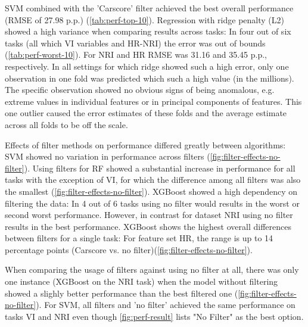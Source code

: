 \documentclass[letterpaper, peerreview, draftcls]{IEEEtran}
\begin{document}
SVM combined with the 'Carscore' filter achieved the best overall performance (RMSE of 27.98 p.p.) (\autoref{tab:perf-top-10}).
Regression with ridge penalty (L2) showed a high variance when comparing results across tasks: In four out of six tasks (all which VI variables and HR-NRI) the error was out of bounds (\autoref{tab:perf-worst-10}).
For NRI and HR RMSE was 31.16 and 35.45 p.p., respectively.
In all settings for which ridge showed such a high error, only one observation in one fold was predicted which such a high value (in the millions).
The specific observation showed no obvious signs of being anomalous, e.g. extreme values in individual features or in principal components of features.
This one outlier caused the error estimates of these folds and the average estimate across all folds to be off the scale.

Effects of filter methods on performance differed greatly between algorithms:
SVM showed no variation in performance across filters (\autoref{fig:filter-effects-no-filter}).
Using filters for RF showed a substantial increase in performance for all tasks with the exception of VI, for which the difference among all filters was also the smallest (\autoref{fig:filter-effects-no-filter}).
XGBoost showed a high dependency on filtering the data: In 4 out of 6 tasks using no filter would results in the worst or second worst performance.
However, in contrast for dataset NRI using no filter results in the best performance.
XGBoost shows the highest overall differences between filters for a single task:
For feature set HR, the range is up to 14 percentage points (Carscore vs. no filter)(\autoref{fig:filter-effects-no-filter}).

When comparing the usage of filters against using no filter at all, there was only one instance (XGBoost on the NRI task) when the model without filtering showed a slighly better performance than the best filtered one (\autoref{fig:filter-effects-no-filter}).
For SVM, all filters and 'no filter' achieved the same performance on tasks VI and NRI even though \autoref{fig:perf-result} lists "No Filter" as the best option.
\end{document}
